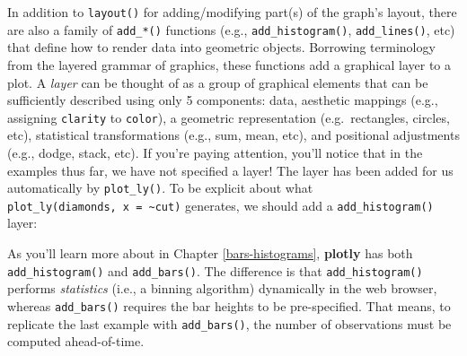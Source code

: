 \documentclass[
  12pt,
]{krantz}
\newenvironment{Shaded}{\begin{snugshade}}{\end{snugshade}}
\newcommand{\DataTypeTok}[1]{\textcolor[rgb]{0.13,0.29,0.53}{#1}}
\newcommand{\KeywordTok}[1]{\textcolor[rgb]{0.13,0.29,0.53}{\textbf{#1}}}
\newcommand{\NormalTok}[1]{#1}
\newcommand{\OperatorTok}[1]{\textcolor[rgb]{0.81,0.36,0.00}{\textbf{#1}}}
\newcommand{\StringTok}[1]{\textcolor[rgb]{0.31,0.60,0.02}{#1}}
\begin{document}
In addition to \texttt{layout()} for adding/modifying part(s) of the graph's layout, there are also a family of \texttt{add\_*()} functions (e.g., \texttt{add\_histogram()}, \texttt{add\_lines()}, etc) that define how to render data into geometric objects. Borrowing terminology from the layered grammar of graphics, these functions add a graphical layer to a plot. A \emph{layer} can be thought of as a group of graphical elements that can be sufficiently described using only 5 components: data, aesthetic mappings (e.g., assigning \texttt{clarity} to \texttt{color}), a geometric representation (e.g.~rectangles, circles, etc), statistical transformations (e.g., sum, mean, etc), and positional adjustments (e.g., dodge, stack, etc). If you're paying attention, you'll notice that in the examples thus far, we have not specified a layer! The layer has been added for us automatically by \texttt{plot\_ly()}. To be explicit about what \texttt{plot\_ly(diamonds,\ x\ =\ \textasciitilde{}cut)} generates, we should add a \texttt{add\_histogram()} layer:

\begin{Shaded}
\end{Shaded}

As you'll learn more about in Chapter \ref{bars-histograms}, \textbf{plotly} has both \texttt{add\_histogram()} and \texttt{add\_bars()}. The difference is that \texttt{add\_histogram()} performs \emph{statistics} (i.e., a binning algorithm) dynamically in the web browser, whereas \texttt{add\_bars()} requires the bar heights to be pre-specified. That means, to replicate the last example with \texttt{add\_bars()}, the number of observations must be computed ahead-of-time.

\begin{Shaded}
\end{Shaded}
\end{document}
